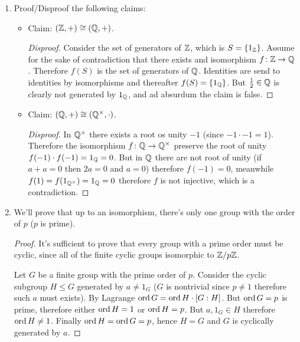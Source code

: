 \documentclass[a4paper]{article}
\begin{document}
\begin{enumerate}
\begin{enumerate}
			\item Let $G = \Z, H = \Z/n\Z$. Claim: $f(z) = [anz]$ for $a \in \Z$ are the only homomorphisms $\Z \to \Z/n\Z$. It's clearly a homomorphisms. And the proof the existence is similar to the one in (A)
			\item 
			\item 
		\end{enumerate}
		\item Proof/Disproof the following claims: 
		\begin{itemize}
			\item Claim: $(\mathbb{Z}, +) \cong (\mathbb{Q}, +)$. \begin{proof}[Disproof]
				Consider the set of generators of $\mathbb{Z}$, which is $S = \{1_{\mathbb{Z}}\}$. Assume for the sake of contradiction that there exists and isomorphism $f \colon \mathbb{Z}\to \mathbb{Q}$. Therefore $f(S)$ is the set of generators of $\mathbb{Q}$. Identities are send to identities by isomorphisms and thereafter $f(S) = \{1_{\mathbb{Q}}\}$. But $\frac{1}{2} \in \mathbb{Q}$ is clearly not generated by $1_{\mathbb{Q}}$, and ad absurdum the claim is false. 
			\end{proof}
			\item Claim: $(\mathbb{Q}, +) \cong (\mathbb{Q}^\times, \cdot)$. \begin{proof}[Disproof]
				In $\mathbb{Q}^\times$ there exists a root os unity $-1$ (since $-1 \cdot -1 = 1$). Therefore the isomorphism $f \colon \mathbb{Q} \to \mathbb{Q}^\times$ preserve the root of unity $f(-1) \cdot f(-1) = 1_{\mathbb{Q}} = 0$. But in $\mathbb{Q}$ there are not root of unity (if $a + a = 0$ then $2a = 0$ and $a = 0$) therefore $f(-1) = 0$, meanwhile $f(1) = f(1_{\mathbb{Q}^{\times}}) = 1_{\mathbb{Q}} = 0$ therefore $f$ is not injective, which is a contradiction. 
			\end{proof}
		\end{itemize}
		\item We'll prove that up to an isomorphism, there's only one group with the order of $p$ ($p$ is prime). \begin{proof}
			It's sufficient to prove that every group with a prime order must be cyclic, since all of the finite cyclic groups isomorphic to $\mathbb{Z}/p\mathbb{Z}$. 
			
			Let $G$ be a finite group with the prime order of $p$. Consider the cyclic subgroup $H \le G$ generated by $a \neq 1_G$ ($G$ is nontrivial since $p \neq 1$ therefore such $a$ must exists). By Lagrange $\operatorname{ord} G = \operatorname{ord} H \cdot [G : H]$. But $\operatorname{ord} G = p$ is prime, therefore either $\operatorname{ord} H = 1$ or $\operatorname{ord} H = p$. But $a, 1_G \in H$ therefore $\operatorname{ord} H \neq 1$. Finally $\operatorname{ord} H = \operatorname{ord} G = p$, hence $H = G$ and $G$ is cyclically generated by $a$. 
		\end{proof}
	\end{enumerate}
	
\end{document}
